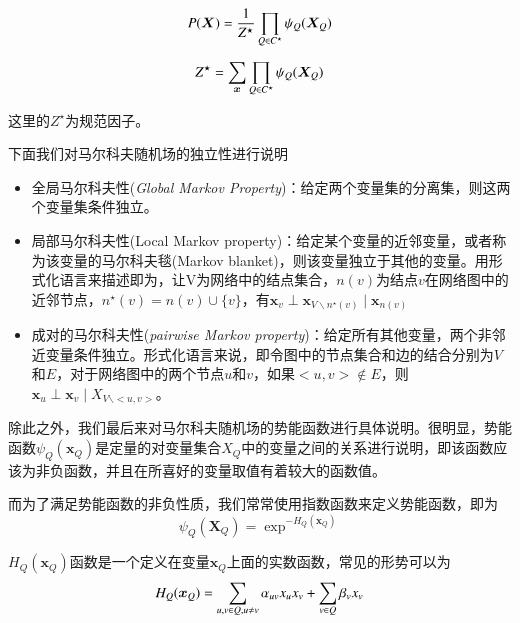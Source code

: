 \begin{equation}
	P(\bm{X}) = \frac{1}{Z^{\star}} \prod_{Q \in C^{\star}} \psi_Q(\bm{X}_Q) \\
\end{equation}


\begin{equation}
Z^{\star} = \sum_{\bm{x}} \prod_{Q \in C^{\star}} \psi_Q(\bm{X}_Q) \\
\end{equation}


这里的$Z^{\star}$为规范因子。


下面我们对马尔科夫随机场的独立性进行说明 \\
\begin{itemize}
\item 全局马尔科夫性(\textit{Global Markov Property})：给定两个变量集的分离集，则这两个变量集条件独立。 
\item 局部马尔科夫性(Local Markov property)：给定某个变量的近邻变量，或者称为该变量的马尔科夫毯(Markov blanket)，则该变量独立于其他的变量。用形式化语言来描述即为，让V为网络中的结点集合，$n(v)$为结点$v$在网络图中的近邻节点，$n^{\star}(v) = n(v)\cup \{v\}$，有$\bm{x}_v \perp \bm{x}_{V 	\backslash n^{\star}(v)} \mid \bm{x}_{n(v)} $ 

\item 成对的马尔科夫性(\textit{pairwise Markov property})：给定所有其他变量，两个非邻近变量条件独立。形式化语言来说，即令图中的节点集合和边的结合分别为$V$和$E$，对于网络图中的两个节点$u$和$v$，如果$<u,v> \notin E$，则$\bm{x}_u \perp \bm{x}_v \mid X_{V \backslash <u, v>}$。


\end{itemize}



除此之外，我们最后来对马尔科夫随机场的势能函数进行具体说明。很明显，势能函数$\psi_Q(\bm{x}_Q)$是定量的对变量集合$X_Q$中的变量之间的关系进行说明，即该函数应该为非负函数，并且在所喜好的变量取值有着较大的函数值。

而为了满足势能函数的非负性质，我们常常使用指数函数来定义势能函数，即为
\begin{equation}
\psi_Q(\bm{X}_Q) = \exp^{-H_Q(\bm{x}_Q)}
\end{equation}

$H_Q(\bm{x}_Q)$函数是一个定义在变量$\bm{x}_Q$上面的实数函数，常见的形势可以为
\begin{equation}
H_Q(\bm{x}_Q) = \sum_{u,v \in Q, u \neq v} \alpha_{uv} x_u x_v + \sum_{v \in Q} \beta_v x_v \\
\end{equation}

